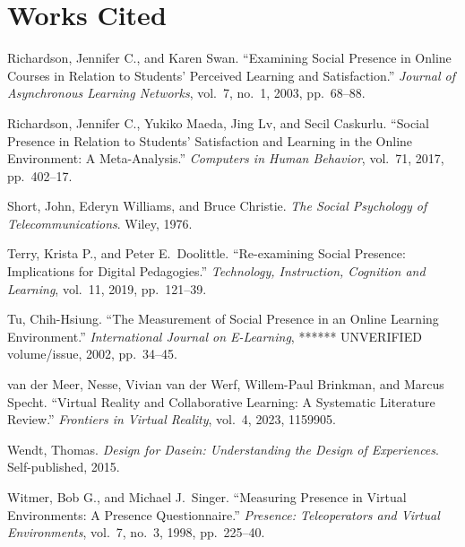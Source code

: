 \documentclass{article}
\newenvironment{workscited}
  {\section*{Works Cited}\begin{list}{}
    {\setlength{\itemindent}{-0.5in}\setlength{\leftmargin}{0.5in}
     \setlength{\itemsep}{0pt}\setlength{\parsep}{6pt}}}
  {\end{list}}
\begin{document}
\begin{workscited}
\item Richardson, Jennifer C., and Karen Swan. ``Examining Social
Presence in Online Courses in Relation to Students' Perceived Learning
and Satisfaction.'' \textit{Journal of Asynchronous Learning Networks},
vol.~7, no.~1, 2003, pp.~68--88. %

\item Richardson, Jennifer C., Yukiko Maeda, Jing Lv, and Secil Caskurlu.
``Social Presence in Relation to Students' Satisfaction and Learning in
the Online Environment: A Meta-Analysis.'' \textit{Computers in Human
Behavior}, vol.~71, 2017, pp.~402--17. %

\item Short, John, Ederyn Williams, and Bruce Christie. \textit{The
Social Psychology of Telecommunications}. Wiley, 1976. %

\item Terry, Krista P., and Peter E.\ Doolittle. ``Re-examining Social
Presence: Implications for Digital Pedagogies.'' \textit{Technology,
Instruction, Cognition and Learning}, vol.~11, 2019, pp.~121--39.

\item Tu, Chih-Hsiung. ``The Measurement of Social Presence in an Online
Learning Environment.'' \textit{International Journal on E-Learning},
****** UNVERIFIED volume/issue, 2002, pp.~34--45.

\item van der Meer, Nesse, Vivian van der Werf, Willem-Paul Brinkman,
and Marcus Specht. ``Virtual Reality and Collaborative Learning: A
Systematic Literature Review.'' \textit{Frontiers in Virtual Reality},
vol.~4, 2023, 1159905. %

\item Wendt, Thomas. \textit{Design for Dasein: Understanding the Design
of Experiences}. Self-published, 2015.

\item Witmer, Bob G., and Michael J.\ Singer. ``Measuring Presence in
Virtual Environments: A Presence Questionnaire.'' \textit{Presence:
Teleoperators and Virtual Environments}, vol.~7, no.~3, 1998,
pp.~225--40. %

\end{workscited}
\end{document}
